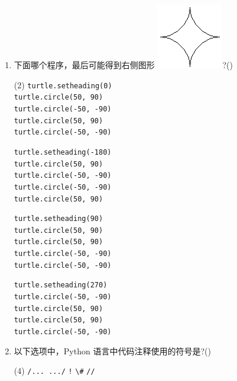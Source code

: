 \documentclass[11pt]{ctexart}
\begin{document}
\begin{enumerate}
        \item 下面哪个程序，最后可能得到右侧图形 \includegraphics[width=.05\textwidth]{24.png}?(\qquad)
        \begin{tasks}(2)
            \task \lstinline{turtle.setheading(0)}\\
            \lstinline{turtle.circle(50, 90)}\\
            \lstinline{turtle.circle(-50, -90)}\\
            \lstinline{turtle.circle(50, 90)}\\
            \lstinline{turtle.circle(-50, -90)}

            \task \lstinline{turtle.setheading(-180)}\\
            \lstinline{turtle.circle(50, 90)}\\
            \lstinline{turtle.circle(-50, -90)}\\
            \lstinline{turtle.circle(-50, -90)}\\
            \lstinline{turtle.circle(50, 90)}

            \task \lstinline{turtle.setheading(90)}\\
            \lstinline{turtle.circle(50, 90)}\\
            \lstinline{turtle.circle(50, 90)}\\
            \lstinline{turtle.circle(-50, -90)}\\
            \lstinline{turtle.circle(-50, -90)}

            \task \lstinline{turtle.setheading(270)}\\
            \lstinline{turtle.circle(-50, -90)}\\
            \lstinline{turtle.circle(50, 90)}\\
            \lstinline{turtle.circle(50, 90)}\\
            \lstinline{turtle.circle(-50, -90)}
        \end{tasks}

        \item 以下选项中，Python 语言中代码注释使用的符号是?(\qquad)
        \begin{tasks}(4)
            \task \lstinline{/... .../}
            \task \lstinline{!}
            \task \lstinline{\#}
            \task \lstinline{//}
        \end{tasks}
    \end{enumerate}
\end{document}

